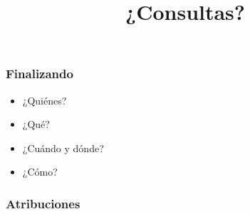 \documentclass[11pt,a4paper,spanish]{beamer}
\begin{document}
\begin{frame}

    \frametitle{Finalizando}

\begin{itemize}

\item ¿Quiénes?

\item ¿Qué?

\item ¿Cuándo y dónde?

\item ¿Cómo?

\end{itemize}

\end{frame}

\begin{frame}

\title{¿Consultas?}
\maketitle

\end{frame}

\setcounter{lastPage}{\number\value{page}}

\begin{frame}%

\frametitle{Atribuciones}


\tiny

\end{frame}

\setcounter{page}{\number\value{lastPage}}
\end{document}
